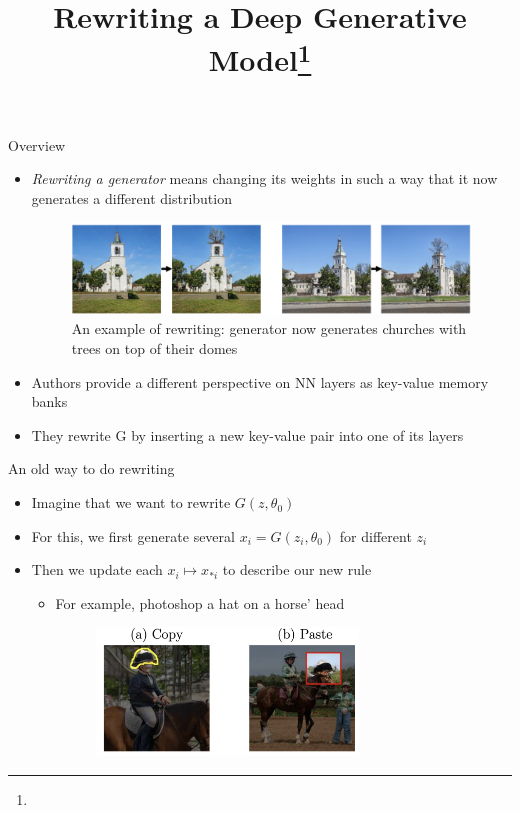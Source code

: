 \documentclass[handout, 10pt]{beamer}
\title{Rewriting a Deep Generative Model\footnote{\citepaper{gan_rewriting}}}
\begin{document}
\begin{frame}
    \titlepage
\end{frame}

\begin{frame}{Overview}
\begin{itemize}
    \item\pause \textit{Rewriting a generator} means changing its weights in such a way that it now generates a different distribution
\begin{figure}
\centering
\includegraphics[width=\textwidth]{images/rewriting-churches}
\caption{An example of rewriting: generator now generates churches with trees on top of their domes}
\end{figure}
    \item\pause Authors provide a different perspective on NN layers as key-value memory banks
    \item\pause They rewrite G by inserting a new key-value pair into one of its layers
\end{itemize}
\end{frame}


\begin{frame}{An old way to do rewriting}
\begin{itemize}
    \item\pause Imagine that we want to rewrite $G(z, \theta_0)$
    \item\pause For this, we first generate several $x_i = G(z_i, \theta_0)$ for different $z_i$
    \item\pause Then we update each $x_i \mapsto x_{*i}$ to describe our new rule
    \begin{itemize}
        \item\pause For example, photoshop a hat on a horse' head
        \begin{figure}
            \centering
            \includegraphics[width=0.7\textwidth]{images/horse-hat-photoshop}
        \end{figure}
    \end{itemize}
\end{itemize}
\end{frame}
\end{document}
